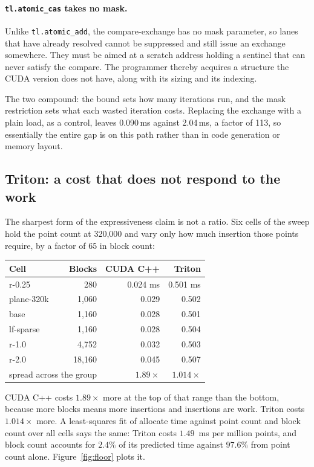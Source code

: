 \documentclass[11pt]{article}
\begin{document}
\paragraph{\texttt{tl.atomic\_cas} takes no mask.} Unlike
\texttt{tl.atomic\_add}, the compare-exchange has no mask parameter, so lanes
that have already resolved cannot be suppressed and still issue an exchange
somewhere. They must be aimed at a scratch address holding a sentinel that can
never satisfy the compare. The programmer thereby acquires a structure the CUDA
version does not have, along with its sizing and its indexing.

The two compound: the bound sets how many iterations run, and the mask
restriction sets what each wasted iteration costs. Replacing the exchange with a
plain load, as a control, leaves 0.090\,ms against 2.04\,ms, a factor of 113, so
essentially the entire gap is on this path rather than in code generation or
memory layout.

\subsection{Triton: a cost that does not respond to the work}
\label{sec:floor}

The sharpest form of the expressiveness claim is not a ratio. Six cells of the
sweep hold the point count at 320{,}000 and vary only how much insertion those
points require, by a factor of 65 in block count:

\begin{center}
\begin{tabular}{lrrr}
\toprule
Cell & Blocks & CUDA C++ & Triton \\
\midrule
r-0.25     &    280 & 0.024 ms & 0.501 ms \\
plane-320k &  1{,}060 & 0.029 & 0.502 \\
base       &  1{,}160 & 0.028 & 0.501 \\
lf-sparse  &  1{,}160 & 0.028 & 0.504 \\
r-1.0      &  4{,}752 & 0.032 & 0.503 \\
r-2.0      & 18{,}160 & 0.045 & 0.507 \\
\midrule
\multicolumn{2}{l}{spread across the group} & $1.89\times$ & $\mathbf{1.014\times}$ \\
\bottomrule
\end{tabular}
\end{center}

CUDA C++ costs $1.89\times$ more at the top of that range than the bottom,
because more blocks means more insertions and insertions are work. Triton costs
$1.014\times$ more. A least-squares fit of allocate time against point count and
block count over all cells says the same: Triton costs $1.49$~ms per million
points, and block count accounts for $2.4\%$ of its predicted time against
$97.6\%$ from point count alone. Figure~\ref{fig:floor} plots it.
\end{document}
